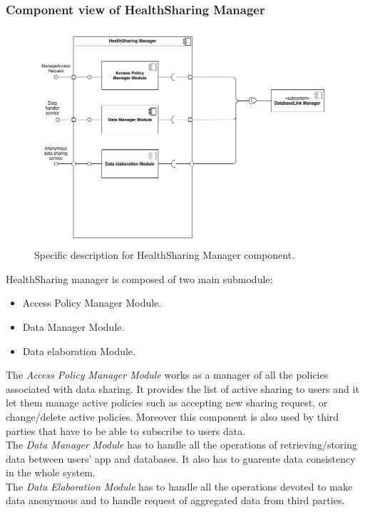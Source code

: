 \documentclass[DD.tex]{subfiles}
\begin{document}
\subsubsection{Component view of HealthSharing Manager}
\begin{figure}[h]
	\centering
	\includegraphics[height=8.00cm,keepaspectratio]{Figures/HealthSharingManagerComponent}
	\caption{Specific description for HealthSharing Manager component.}
\end{figure}

HealthSharing manager is composed of two main submodule: \begin{itemize}
	\item Access Policy Manager Module.
	\item Data Manager Module.
	\item Data elaboration Module.
\end{itemize}

The \textit{Access Policy Manager Module} works as a manager of all the policies associated with data sharing. It provides the list of active sharing to users and it let them manage active policies such as accepting new sharing request, or change/delete active policies. Moreover this component is also used by third parties that have to be able to subscribe to users data.\\
The \textit{Data Manager Module} has to handle all the operations of retrieving/storing data between users' app and databases. It also has to guarente data consistency in the whole system.
	\\
The \textit{Data Elaboration Module} has to handle all the operations devoted to make data anonymous and to handle request of aggregated data from third parties.
\newpage
\end{document}
